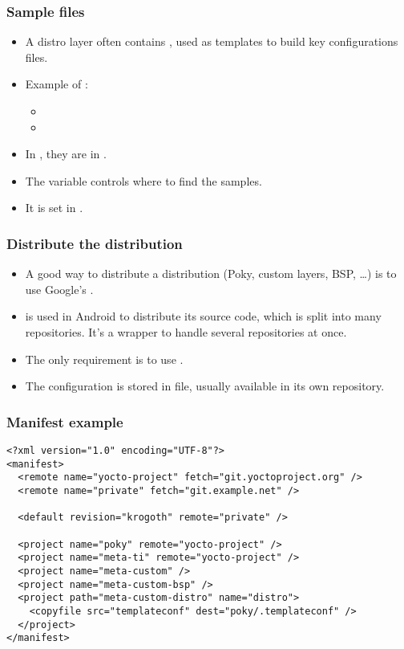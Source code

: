 \begin{frame}
  \frametitle{Sample files}
  \begin{itemize}
    \item A distro layer often contains , used as
      templates to build key configurations files.
    \item Example of :
      \begin{itemize}
        \item {}
        \item {}
      \end{itemize}
    \item In , they are in .
    \item The  variable controls where to find the
      samples.
    \item It is set in .
  \end{itemize}
\end{frame}

\begin{frame}
  \frametitle{Distribute the distribution}
  \begin{itemize}
    \item A good way to distribute a distribution (Poky, custom
      layers, BSP, \dots) is to use Google's
      .
    \item {} is used in Android to distribute its source
      code, which is split into many  repositories. It's a
      wrapper to handle several  repositories at once.
    \item The only requirement is to use .
    \item The  configuration is stored in 
      file, usually available in its own  repository.
  \end{itemize}
\end{frame}

\begin{frame}[fragile]
  \frametitle{Manifest example}
  \begin{verbatim}
<?xml version="1.0" encoding="UTF-8"?>
<manifest>
  <remote name="yocto-project" fetch="git.yoctoproject.org" />
  <remote name="private" fetch="git.example.net" />

  <default revision="krogoth" remote="private" />

  <project name="poky" remote="yocto-project" />
  <project name="meta-ti" remote="yocto-project" />
  <project name="meta-custom" />
  <project name="meta-custom-bsp" />
  <project path="meta-custom-distro" name="distro">
    <copyfile src="templateconf" dest="poky/.templateconf" />
  </project>
</manifest>
  \end{verbatim}
\end{frame}


